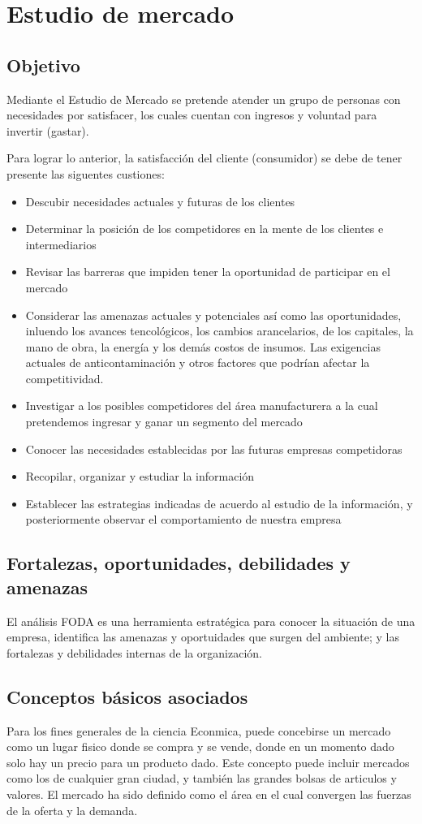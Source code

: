 \chapter{Estudio de mercado}
\section{Objetivo}
Mediante el Estudio de Mercado se pretende atender un grupo de personas con necesidades por
satisfacer, los cuales cuentan con ingresos y voluntad para invertir (gastar).

Para lograr lo anterior, la satisfacción del cliente (consumidor) se debe de tener presente
las siguentes custiones:
\begin{itemize}
    \item Descubir necesidades actuales y futuras de los clientes
    \item Determinar la posición de los competidores en la mente de los clientes e intermediarios
    \item Revisar las barreras que impiden tener la oportunidad de participar en el mercado
    \item Considerar las amenazas actuales y potenciales así como las oportunidades, inluendo los
    avances tencológicos, los cambios arancelarios, de los capitales, la mano de obra, la energía
    y los demás costos de insumos. Las exigencias actuales de anticontaminación y otros factores
    que podrían afectar la competitividad.
    \item Investigar a los posibles competidores del área manufacturera a la cual pretendemos
    ingresar y ganar un segmento del mercado
    \item Conocer las necesidades establecidas por las futuras empresas competidoras
    \item Recopilar, organizar y estudiar la información
    \item Establecer las estrategias indicadas de acuerdo al estudio de la información, y
posteriormente observar el comportamiento de nuestra empresa
\end{itemize}
\section{Fortalezas, oportunidades, debilidades y amenazas}
El análisis FODA es una herramienta estratégica para conocer la situación de una empresa,
identifica las amenazas y oportuidades que surgen del ambiente; y las fortalezas y debilidades
internas de la organización.
\section{Conceptos básicos asociados}%
Para los fines generales de la ciencia Econmica, puede concebirse un mercado como un lugar
fisico donde se compra y se vende, donde en un momento dado solo hay un precio para un producto
dado. Este concepto puede incluir mercados como los de cualquier gran ciudad, y también las
grandes bolsas de articulos y valores. El mercado ha sido definido como el área en el cual
convergen las fuerzas de la oferta y la demanda.
